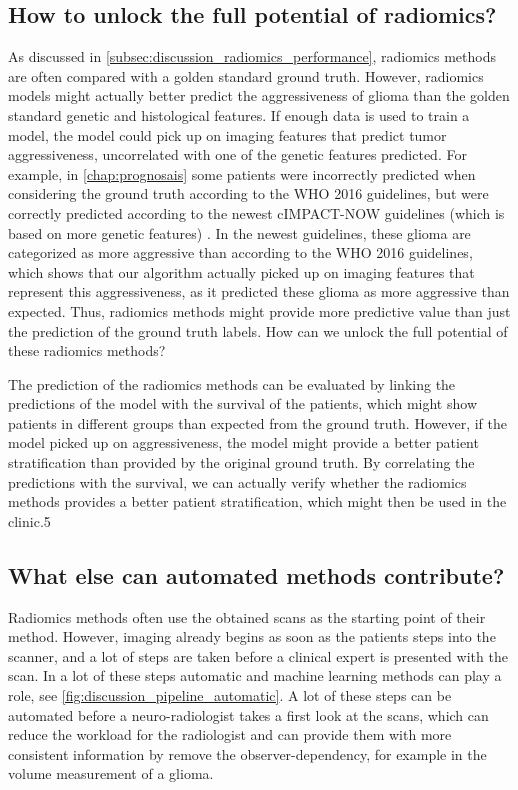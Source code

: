 \subsection{How to unlock the full potential of radiomics?}

As discussed in \cref{subsec:discussion_radiomics_performance}, radiomics methods are often compared with a golden standard ground truth.
However, radiomics models might actually better predict the aggressiveness of \gls{glioma} than the golden standard genetic and histological features.
If enough data is used to train a model, the model could pick up on imaging features that predict \gls{tumor} aggressiveness, uncorrelated with one of the genetic features predicted.
For example, in \cref{chap:prognosais} some patients were incorrectly predicted when considering the ground truth according to the \gls{WHO} 2016 guidelines, but were correctly predicted according to the newest cIMPACT-NOW guidelines (which is based on more genetic features) \autocite{lous2020impactnow}.
In the newest guidelines, these glioma are categorized as more aggressive than according to the \gls{WHO} 2016 guidelines, which shows that our algorithm actually picked up on imaging features that represent this aggressiveness, as it predicted these glioma as more aggressive than expected.
Thus, radiomics methods might provide more predictive value than just the prediction of the ground truth labels.
How can we unlock the full potential of these radiomics methods?

The prediction of the radiomics methods can be evaluated by linking the predictions of the model with the survival of the patients, which might show patients in different groups than expected from the ground truth.
However, if the model picked up on aggressiveness, the model might provide a better patient stratification than provided by the original ground truth.
By correlating the predictions with the survival, we can actually verify whether the radiomics methods provides a better patient stratification, which might then be used in the clinic.5

\subsection{What else can automated methods contribute?}

Radiomics methods often use the obtained scans as the starting point of their method.
However, imaging already begins as soon as the patients steps into the scanner, and a lot of steps are taken before a clinical expert is presented with the scan.
In a lot of these steps automatic and machine learning methods can play a role, see \cref{fig:discussion_pipeline_automatic}.
A lot of these steps can be automated before a neuro-radiologist takes a first look at the scans, which can reduce the workload for the radiologist and can provide them with more consistent information by remove the observer-dependency, for example in the volume measurement of a \gls{glioma}.



